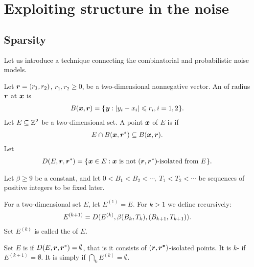 \documentclass[12pt]{memoir}
\def\B{B}
\newcommand{\Tu}{T}
\newcommand{\Z}{Z}
\begin{document}


\section{Exploiting structure in the noise}\label{sec:noise}

\subsection{Sparsity}
Let us introduce a technique connecting the combinatorial and probabilistic
noise models.

\begin{definition}
Let \( \boldsymbol{r}=(r_1,r_2) \), \( r_1, r_2\ge 0 \),
be a two-dimensional nonnegative vector.
An  of radius \( \boldsymbol{r} \)  at \( \boldsymbol{x} \) is
\begin{align}\label{eq:ball1}
  B(\boldsymbol{x},\boldsymbol{r}) = \mathopen\{\mskip 1mu\boldsymbol{y} : |y_i - x_i| \leqslant r_i, i=1,2\mskip 1mu\mathclose\}.
\end{align}  
Let \( E\subseteq \mathbb{Z}^{2} \) be a two-dimensional set.
A point \( \boldsymbol{x} \) of \( E \) is  if
\begin{align*}
  E \cap B(\boldsymbol{x},\boldsymbol{r}^*)\subseteq B(\boldsymbol{x}, \boldsymbol{r}).
 \end{align*}
  Let
\begin{align}
  D(E,\boldsymbol{r}, \boldsymbol{r}^*) =
     \mathopen\{\mskip 1mu\boldsymbol{x}\in E : \boldsymbol{x} \text{\rmfamily\mdseries\upshape{ is not }} (\boldsymbol{r}, \boldsymbol{r}^*)\text{\rmfamily\mdseries\upshape{-isolated
  from }} E\mskip 1mu\mathclose\}.
\end{align}
\end{definition}

\begin{definition}[Sparsity]
Let \( \beta\ge 9 \) be a constant, and let 
\( 0<\B_{1}<\B_{2}<\dotsm \), \( \Tu_{1}<\Tu_{2}<\dotsm \) be 
sequences of positive integers to be fixed later.

For a two-dimensional set \( E \), let \( E^{(1)} = E \).
For \( k>1 \) we define recursively:
\begin{align}\label{eq:noise^k}
    E^{(k+1)} = D(E^{(k)}, \beta\pair{\B_k}{\Tu_{k}}, \pair{\B_{k+1}}{\Tu_{k+1}}).
\end{align}
Set \( E^{(k)} \) is called the  of \( E \).

Set \( E \) is  
if \( D(E, \boldsymbol{r}, \boldsymbol{r}^*)=\emptyset \), that is 
it consists of \( (\boldsymbol{r}, \boldsymbol{r^*}) \)-isolated points.
It is \( k \)- if \( E^{(k+1)}=\emptyset \).
It is simply  if \( \bigcap_{k}E^{(k)}=\emptyset \).
\end{definition}
\end{document}
